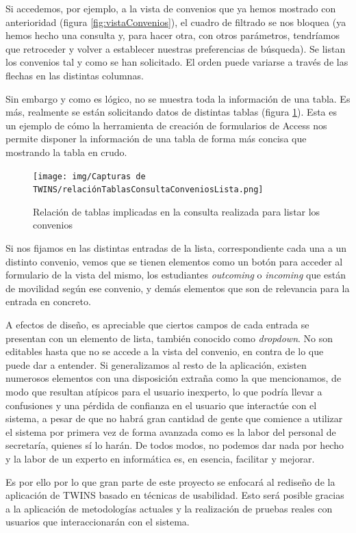 Si accedemos, por ejemplo, a la vista de convenios que ya hemos mostrado con anterioridad (figura \ref{fig:vistaConvenios}), el cuadro de filtrado se nos bloquea (ya hemos hecho una consulta y, para hacer otra, con otros parámetros, tendríamos que retroceder y volver a establecer nuestras preferencias de búsqueda). Se listan los convenios tal y como se han solicitado. El orden puede variarse a través de las flechas en las distintas columnas.

Sin embargo y como es lógico, no se muestra toda la información de una tabla. Es más, realmente se están solicitando datos de distintas tablas (figura \ref{fig:tablasConsultaConvenios}). Esta es un ejemplo de cómo la herramienta de creación de formularios de Access nos permite disponer la información de una tabla de forma más concisa que mostrando la tabla en crudo.

\begin{figure}
	\centering
	\texttt{[image: img/Capturas de TWINS/relaciónTablasConsultaConveniosLista.png]}
	\caption{Relación de tablas implicadas en la consulta realizada para listar los convenios}
	\label{fig:tablasConsultaConvenios}
\end{figure}

Si nos fijamos en las distintas entradas de la lista, correspondiente cada una a un distinto convenio, vemos que se tienen elementos como un botón para acceder al formulario de la vista del mismo, los estudiantes \textit{outcoming} o \textit{incoming} que están de movilidad según ese convenio, y demás elementos que son de relevancia para la entrada en concreto.

A efectos de diseño, es apreciable que ciertos campos de cada entrada se presentan con un elemento de lista, también conocido como \textit{dropdown}. No son editables hasta que no se accede a la vista del convenio, en contra de lo que puede dar a entender. Si generalizamos al resto de la aplicación, existen numerosos elementos con una disposición extraña como la que mencionamos, de modo que resultan atípicos para el usuario inexperto, lo que podría llevar a confusiones y una pérdida de confianza en el usuario que interactúe con el sistema, a pesar de que no habrá gran cantidad de gente que comience a utilizar el sistema por primera vez de forma avanzada como es la labor del personal de secretaría, quienes sí lo harán. De todos modos, no podemos dar nada por hecho y la labor de un experto en informática es, en esencia, facilitar y mejorar.

Es por ello por lo que gran parte de este proyecto se enfocará al rediseño de la aplicación de TWINS basado en técnicas de usabilidad. Esto será posible gracias a la aplicación de metodologías actuales y la realización de pruebas reales con usuarios que interaccionarán con el sistema.

